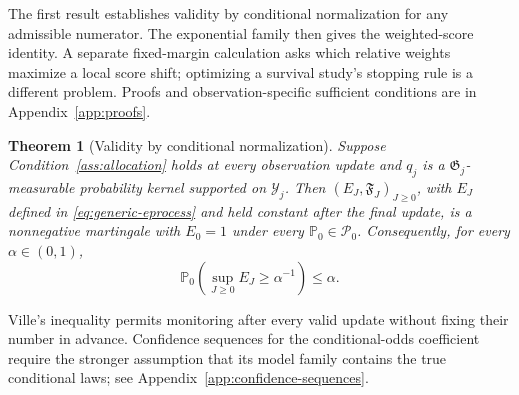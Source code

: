 \documentclass[12pt]{article}
\newtheorem{theorem}{Theorem}[section]
\theoremstyle{definition}
\theoremstyle{remark}
\begin{document}
The first result establishes validity by conditional normalization for any admissible numerator. The exponential family then gives the weighted-score identity. A separate fixed-margin calculation asks which relative weights maximize a local score shift; optimizing a survival study's stopping rule is a different problem. Proofs and observation-specific sufficient conditions are in Appendix~\ref{app:proofs}.

\begin{theorem}[Validity by conditional normalization]
\label{thm:master}
Suppose Condition~\ref{ass:allocation} holds at every observation update and $q_j$ is a $\mathfrak G_j$-measurable probability kernel supported on $\mathcal Y_j$. Then $(E_J,\mathfrak F_J)_{J\geq0}$, with $E_J$ defined in \eqref{eq:generic-eprocess} and held constant after the final update, is a nonnegative martingale with $E_0=1$ under every $\mathbb P_0\in\mathcal P_0$. Consequently, for every $\alpha\in(0,1)$,
\begin{equation}
 \mathbb P_0\left(\sup_{J\geq0}E_J\geq\alpha^{-1}\right)\leq\alpha.
 \label{eq:ville-bound}
\end{equation}
\end{theorem}
Ville's inequality \citep{Ville1939} permits monitoring after every valid update without fixing their number in advance. Confidence sequences for the conditional-odds coefficient require the stronger assumption that its model family contains the true conditional laws; see Appendix~\ref{app:confidence-sequences}.
\end{document}
